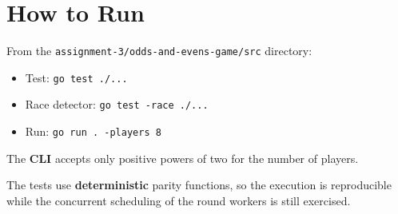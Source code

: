 \section{How to Run}

From the \texttt{assignment-3/odds-and-evens-game/src} directory:

\begin{itemize}
  \item Test: \texttt{go test ./...}
  \item Race detector: \texttt{go test -race ./...}
  \item Run: \texttt{go run . -players 8}
\end{itemize}

The \textbf{CLI} accepts only positive powers of two for the number of players.

The tests use \textbf{deterministic} parity functions, so the execution is reproducible while the concurrent scheduling of
the round workers is still exercised.
